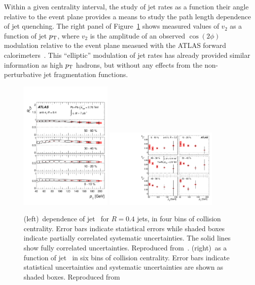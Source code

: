 Within a given centrality interval, the study of jet rates as a function their angle relative 
to the event plane provides a means to study the path length dependence of jet quenching.
The right panel of Figure~\ref{fig:pas:rcprfour} shows measured values of $v_2$ as a function
of jet $\mbox{$p_{\mathrm{T}}$}$, where $v_2$ is the amplitude of an observed $\cos(2\phi)$ modulation relative to
the event plane measued with the ATLAS forward calorimeters~\cite{Aad:2013sla}.  
This ``elliptic'' modulation of
jet rates has already provided similar information as high $\mbox{$p_{\mathrm{T}}$}$ hadrons, but without 
any effects from the non-perturbative jet fragmentation functions.

\begin{figure}[!th]
\begin{center}
\includegraphics[width=0.4\textwidth]{jetfigures/ATLAS_jetRCP_04.pdf}
\includegraphics[width=0.49\textwidth]{jetfigures/ATLAS_jetv2.pdf}
\caption{
(left)\pT\ dependence of jet \Rcp\ for  $R=0.4$ jets,
in four bins of collision centrality. Error bars indicate
statistical errors while shaded boxes indicate
partially correlated systematic uncertainties. 
The solid lines show fully correlated uncertainties. 
Reproduced from~\cite{Aad:2012is}.
(right)\vtjet\ as a function of jet \pT\ in six bins of 
collision centrality.
Error bars indicate statistical uncertainties and 
systematic uncertainties are shown as shaded boxes. Reproduced from~\cite{Aad:2013sla}
}
\label{fig:pas:rcprfour}
\end{center}
\end{figure}

